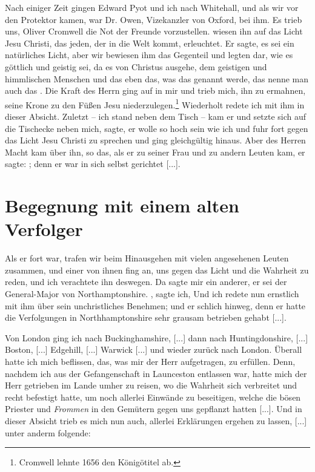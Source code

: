 Nach einiger Zeit gingen Edward Pyot 
und ich nach Whitehall, und als wir vor 
den Protektor kamen, war Dr. Owen, 
Vizekanzler von Oxford, bei ihm. Es trieb uns, 
Oliver Cromwell die
Not der Freunde vorzustellen.   wiesen ihn auf das Licht
Jesu Christi, das jeden, der in die Welt kommt, erleuchtet.
Er sagte, es sei ein natürliches Licht, aber wir bewiesen ihm das
Gegenteil und legten dar, wie es göttlich und geistig sei, da es
von Christus ausgehe, dem geistigen und himmlischen Menschen
und das eben das, was das  genannt werde,
das nenne man auch das . Die Kraft des Herrn
ging auf in mir und trieb mich, ihn zu ermahnen, seine Krone
zu den Füßen Jesu niederzulegen.\footnote{Cromwell 
lehnte 1656 den Königötitel ab.} Wiederholt redete ich mit
ihm in dieser Absicht. Zuletzt -- ich stand neben dem Tisch --
kam er und setzte sich auf die Tischecke neben mich, sagte, er wolle
so hoch sein wie ich und fuhr fort gegen das Licht Jesu Christi
zu sprechen und ging gleichgültig hinaus. Aber des Herren Macht
kam über ihn, so das, als er zu seiner Frau und zu andern
Leuten kam, er sagte: ;
denn er war in sich selbst gerichtet [...].

\section{Begegnung mit einem alten Verfolger}

Als er fort war, trafen wir beim Hinausgehen mit vielen
angesehenen Leuten zusammen, und einer von ihnen fing an, uns
gegen das Licht und die Wahrheit zu reden, und ich verachtete
ihn deswegen. Da sagte mir ein anderer, 
er sei der General-Major von 
Northamptonshire. 
, sagte ich,  Und ich
redete nun ernstlich mit ihm über sein unchristliches Benehmen;
und er schlich hinweg, denn er hatte die Verfolgungen in 
Northhamptonshire sehr grausam betrieben 
gehabt [...].

Von London ging ich nach Buckinghamshire, 
[...] dann nach Huntingdonshire, [...] 
Boston, [...] Edgehill, [...] 
Warwick [...]
und wieder zurück nach London. Überall hatte ich mich beflissen,
das, was mir der Herr aufgetragen, zu erfüllen. Denn, nachdem
ich aus der Gefangenschaft in Launceston entlassen war, hatte mich
der Herr getrieben im Lande umher zu reisen, wo die Wahrheit
sich verbreitet und recht befestigt hatte, um noch allerlei 
Einwände zu beseitigen, welche die bösen Priester und \textit{Frommen}
in den Gemütern gegen uns gepflanzt hatten [...]. Und in
dieser Absicht trieb es mich nun auch, allerlei Erklärungen ergehen
zu lassen, [...] unter anderm folgende: 

